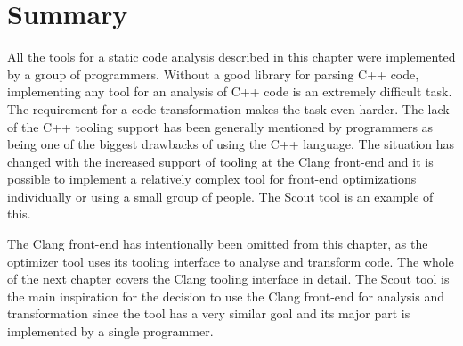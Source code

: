 \section{Summary}
All the tools for a static code analysis described in this chapter were implemented by a group of programmers. Without a good library for parsing C++ code, implementing any tool for an analysis of C++ code is an extremely difficult task. The requirement for a code transformation makes the task even harder. The lack of the C++ tooling support has been generally mentioned by programmers as being one of the biggest drawbacks of using the C++ language. The situation has changed with the increased support of tooling at the Clang front-end and it is possible to implement a relatively complex tool for front-end optimizations individually or using a small group of people. The Scout tool is an example of this.

The Clang front-end has intentionally been omitted from this chapter, as the optimizer tool uses its tooling interface to analyse and transform code. The whole of the next chapter covers the Clang tooling interface in detail. The Scout tool is the main inspiration for the decision to use the Clang front-end for analysis and transformation since the tool has a very similar goal and its major part is implemented by a single programmer.